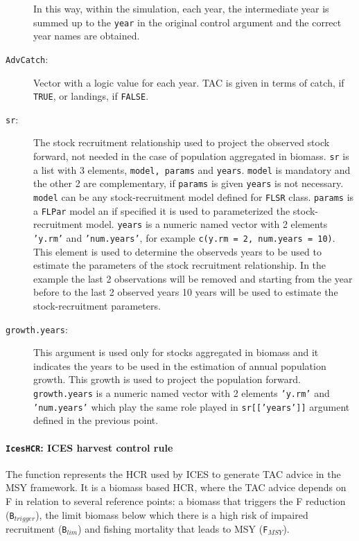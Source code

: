 \begin{description}
			In this way, within the simulation, each year, the intermediate year is summed up to the \texttt{year} in the original control
			argument and the correct year names are obtained. 
		\item[\texttt{AdvCatch}:] Vector with a logic value for each year. TAC is given in terms of catch, if \texttt{TRUE}, or landings, if \texttt{FALSE}.
		\item[\texttt{sr}:] The stock recruitment relationship used to project the observed stock forward, not needed in the
			case of population aggregated in biomass. \texttt{sr} is a list with 3 elements, \texttt{model, params} and
			\texttt{years}. \texttt{model} is mandatory and the other 2 are complementary, if \texttt{params} is given
			\texttt{years} is not necessary. \texttt{model} can be any stock-recruitment model defined for \texttt{FLSR} 
			class. \texttt{params} is a \texttt{FLPar} model an if specified it is used to parameterized the 
			stock-recruitment model.  \texttt{years} is a numeric named vector with 2 elements \texttt{'y.rm'} and 
			\texttt{'num.years'}, for example \texttt{c(y.rm = 2, num.years = 10)}. This element is used to 
			determine the observeds years to be used to estimate the parameters of the stock recruitment relationship. 
			In the example the last 2 observations will be removed and starting from the year before to the last 2 observed years 
			10 years will be used to estimate the stock-recruitment parameters.
		\item[\texttt{growth.years}:] This argument is used only for stocks aggregated in biomass and it indicates the years
			to be used in the estimation of annual population growth. This growth is used to project the population forward. 
			\texttt{growth.years} is a numeric named vector with 2 elements \texttt{'y.rm'} and 
			\texttt{'num.years'} which play the same role played in \texttt{sr[['years']]} argument defined in the 
			previous point.
	\end{description}

\paragraph{\texttt{IcesHCR}: ICES harvest control rule} \hspace{0pt} \smallskip

  The function represents the HCR used by ICES to generate TAC advice in the MSY framework. It is a biomass based HCR, where the TAC advice depends on F in relation to several reference points: a biomass that triggers the F reduction (\texttt{B$_{trigger}$}), the limit biomass below which there is a high risk of impaired recruitment (\texttt{B$_{lim}$}) and fishing mortality that leads to MSY (\texttt{F$_{MSY}$}).
  
